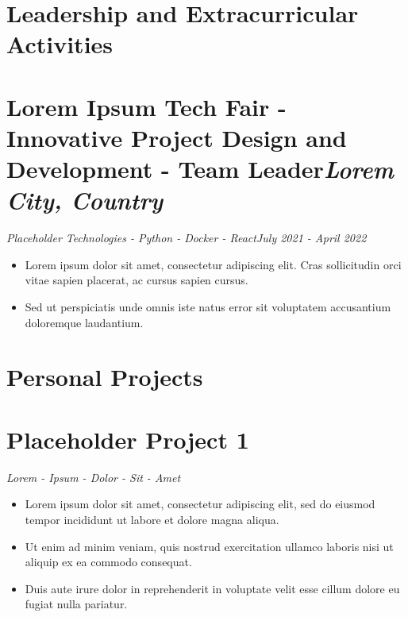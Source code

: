 \documentclass[8pt,letter]{article}%
\begin{document}
%
\vspace{0cm}%
\vspace{-0.2cm}%
\section*{\large\textbf{Leadership and Extracurricular Activities}}%
\vspace{-0.5cm}%
\noindent\makebox[\linewidth]{\rule{\linewidth}{0.4pt}}%
\vspace{-0.16cm}%
\vspace{-0.4cm}%
\section*{\fontsize{10}{12}\selectfont\textbf{Lorem Ipsum Tech Fair - Innovative Project Design and Development - Team Leader}\hfill\textit{Lorem City, Country}}%
\label{sec:fontsize1012selectfonttextbfLoremIpsumTechFair{-}InnovativeProjectDesignandDevelopment{-}TeamLeaderhfilltextitLoremCity,Country}%
\vspace{-0.3cm}\textit{Placeholder Technologies - Python - Docker - React}\hfill\textit{July 2021 - April 2022}\vspace{-0.1cm}%
\begin{itemize}%
\item%
Lorem ipsum dolor sit amet, consectetur adipiscing elit. Cras sollicitudin orci vitae sapien placerat, ac cursus sapien cursus.%
\item%
Sed ut perspiciatis unde omnis iste natus error sit voluptatem accusantium doloremque laudantium.%
\end{itemize}

%
\vspace{0cm}%
\vspace{-0.2cm}%
\section*{\large\textbf{Personal Projects}}%
\vspace{-0.5cm}%
\noindent\makebox[\linewidth]{\rule{\linewidth}{0.4pt}}%
\vspace{-0.16cm}%
\vspace{-0.4cm}%
\section*{\fontsize{10}{12}\selectfont\textbf{Placeholder Project 1}\hfill\textit{}}%
\label{sec:fontsize1012selectfonttextbfPlaceholderProject1hfilltextit}%
\vspace{-0.3cm}\textit{Lorem - Ipsum - Dolor - Sit - Amet}\hfill\textit{}\vspace{-0.1cm}%
\begin{itemize}%
\item%
Lorem ipsum dolor sit amet, consectetur adipiscing elit, sed do eiusmod tempor incididunt ut labore et dolore magna aliqua.%
\item%
Ut enim ad minim veniam, quis nostrud exercitation ullamco laboris nisi ut aliquip ex ea commodo consequat.%
\item%
Duis aute irure dolor in reprehenderit in voluptate velit esse cillum dolore eu fugiat nulla pariatur.%
\end{itemize}
\end{document}

